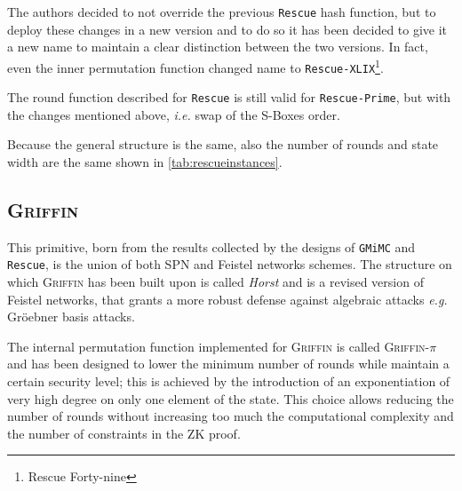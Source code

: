 \documentclass[12pt, a4paper]{report}
\begin{document}
The authors decided to not override the previous \texttt{Rescue} hash function, but to deploy these changes in a new version and to do so it has been decided to give it a new name to maintain a clear distinction between the two versions.
In fact, even the inner permutation function changed name to \texttt{Rescue-XLIX}\footnote{Rescue Forty-nine}.

The round function described for \texttt{Rescue} is still valid for \texttt{Rescue-Prime}, but with the changes mentioned above, \textsl{i.e.} swap of the S-Boxes order.

Because the general structure is the same, also the number of rounds and state width are the same shown in \autoref{tab:rescueinstances}.

\subsection{\textsc{Griffin}}\label{subsec:griffin}

This primitive, born from the results collected by the designs of \texttt{GMiMC} and \texttt{Rescue}, is the union of both SPN and Feistel networks schemes.
The structure on which \textsc{Griffin} has been built upon is called \textit{Horst} and is a revised version of Feistel networks, that grants a more robust defense against algebraic attacks \textsl{e.g.} Gr\"oebner basis attacks.

The internal permutation function implemented for \textsc{Griffin} is called \textsc{Griffin-$\pi$} and has been designed to lower the minimum number of rounds while maintain a certain security level; this is achieved by the introduction of an exponentiation of very high degree on only one element of the state. This choice allows reducing the number of rounds without increasing too much the computational complexity and the number of constraints in the ZK proof.
\end{document}
